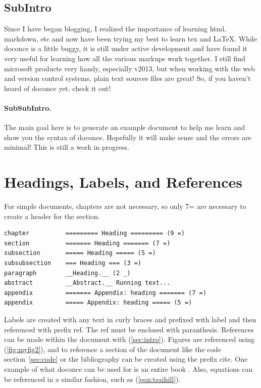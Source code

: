 \documentclass[%
twocolumn,
twoside,                 %
final,                   %
10pt]{article}
\begin{document}
\subsection{SubIntro}
Since I have began blogging, I realized the importance of learning html, markdown, etc and now have been trying my best to learn tex and {\LaTeX}. While doconce is a little buggy, it is still under active development and have found it very useful for learning how all the various markups work together. I still find microsoft products very handy, especially v2013, but when working with the web and version control systems, plain text sources files are great! So, if you haven't heard of doconce yet, check it out! 

\paragraph{SubSubIntro.}
The main goal here is to generate an example document to help me learn and show you the syntax of doconce. Hopefully it will make sense and the errors are minimal! This is still a work in progress.


\section{Headings, Labels, and References}
\label{sec:hlr}

For simple documents, chapters are not necessary, so only 7= are necessary to create a header for the section.

\begin{verbatim}
chapter	         ========= Heading ========= (9 =)
section	         ======= Heading ======= (7 =)
subsection	     ===== Heading ===== (5 =)
subsubsection	 === Heading === (3 =)
paragraph	     __Heading.__ (2 _)
abstract	     __Abstract.__ Running text...
appendix	     ======= Appendix: heading ======= (7 =)
appendix	     ===== Appendix: heading ===== (5 =)
\end{verbatim}


Labels are created with any text in curly braces and prefixed with label and then referenced with prefix ref. The ref must be enclosed with paranthesis. References can be made within the document with (\ref{sec:intro}). Figures are referenced using (\ref{fig:myfig2}), and to reference a section of the document like the code section~\ref{sec:code}  or the bibliography can be created using the prefix cite. One example of what doconce can be used for is an entire book \cite{Langtangen}. Also, equations can be referenced in a similar fashion, such as (\ref{eqn:tsaihill}). 
\end{document}
